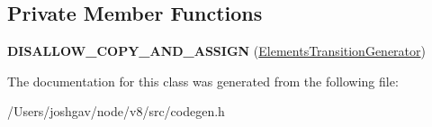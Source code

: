 \subsection*{Private Member Functions}
\begin{DoxyCompactItemize}
\item 
{\bfseries D\+I\+S\+A\+L\+L\+O\+W\+\_\+\+C\+O\+P\+Y\+\_\+\+A\+N\+D\+\_\+\+A\+S\+S\+I\+GN} (\hyperlink{classv8_1_1internal_1_1_elements_transition_generator}{Elements\+Transition\+Generator})\hypertarget{classv8_1_1internal_1_1_elements_transition_generator_a15144772c6bfdc7ae0b02ae4b715e8a3}{}\label{classv8_1_1internal_1_1_elements_transition_generator_a15144772c6bfdc7ae0b02ae4b715e8a3}

\end{DoxyCompactItemize}


The documentation for this class was generated from the following file\+:\begin{DoxyCompactItemize}
\item 
/\+Users/joshgav/node/v8/src/codegen.\+h\end{DoxyCompactItemize}
